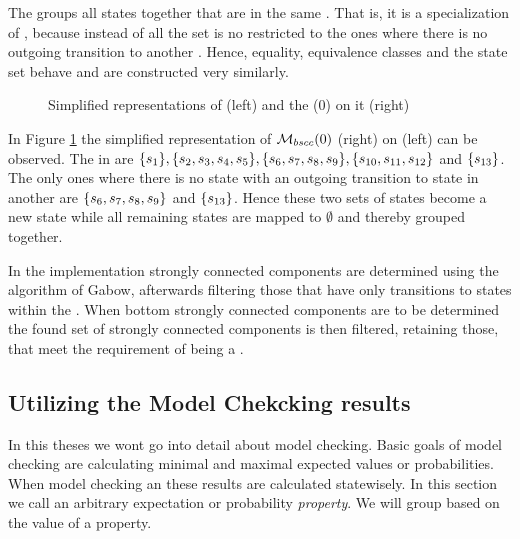 \documentclass[preview]{standalone}
\begin{document}
The \viewN \viewbscc groups all states together that are in the same \bsccN. That is, it is a specialization of \viewscc, because instead of all \sccsN the set is no restricted to the ones where there is no outgoing transition to another \sccN. Hence, equality, equivalence classes and the state set behave and are constructed very similarly.

\begin{figure}[h]
	\begin{minipage}{.55\textwidth}
		\hspace{5mm}
		
	\end{minipage}
	\begin{minipage}{.5\textwidth}		
		
	\end{minipage}
	\caption{Simplified representations of \mdp (left) and the \viewN \viewbscc(0) on it (right)}
	\label{fig:bsccAfter}  
\end{figure}

In Figure \ref{fig:bsccAfter} the simplified representation of ${{{{{\mathcal{M}}}}_{{bscc}}}}(0)$ (right) on \chgph (left) can be observed. The \sccsN in \chgph are $\{{s}_1\}, \{{s}_2, {s}_3, {s}_4, {s}_5\}, \{{s}_6, {s}_7, {s}_8, {s}_9\}, \{{s}_{10}, {s}_{11}, {s}_{12}\}$ and $\{{s}_{13}\}$. The only ones where there is no state with an outgoing transition to state in another \sccN are $\{{s}_6, {s}_7, {s}_8, {s}_9\}$ and $\{{s}_{13}\}$. Hence these two sets of states become a new state \viewbscc while all remaining states are mapped to $\emptyset$ and thereby grouped together.

In the implementation strongly connected components are determined using the algorithm of Gabow, afterwards filtering those \sccsN that have only transitions to states within the \sccN. When bottom strongly connected components are to be determined the found set of strongly connected components is then filtered, retaining those, that meet the requirement of being a \bsccN.

\subsection{Utilizing the Model Chekcking results}
In this theses we wont go into detail about model checking. Basic goals of model checking are calculating minimal and maximal expected values or probabilities. When model checking an \chgph these results are calculated statewisely. In this section we call an arbitrary expectation or probability \emph{property}. We will group based on the value of a property.
\end{document}
